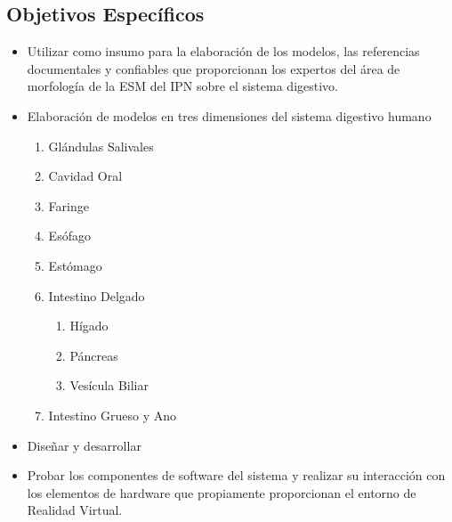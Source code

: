 \subsection{Objetivos Específicos}
\begin{itemize}
	\item Utilizar como insumo para la elaboración de los modelos, las referencias documentales y confiables que proporcionan los expertos del área de morfología de la ESM del IPN sobre el sistema digestivo.
	\item Elaboración de modelos en tres dimensiones del sistema digestivo humano
	\begin{enumerate}
		\item Glándulas Salivales
		\item Cavidad Oral
		\item Faringe
		\item Esófago
		\item Estómago
		\item Intestino Delgado
		\begin{enumerate}
		  \item Hígado
		  \item Páncreas
		  \item Vesícula Biliar
		\end{enumerate}
		\item Intestino Grueso y Ano  
	  \end{enumerate}
	\item Diseñar y desarrollar
	\item Probar los componentes de software del sistema y realizar su interacción con los elementos de hardware que propiamente proporcionan el entorno de  Realidad Virtual.	
\end{itemize}

